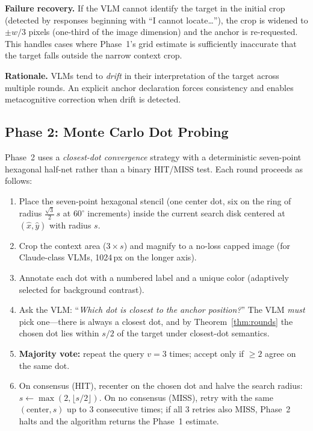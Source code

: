 \documentclass[sigconf,nonacm]{acmart}
\begin{document}
\textbf{Failure recovery.}  If the VLM cannot identify the target in
the initial crop (detected by responses beginning with ``I cannot
locate\ldots''), the crop is widened to $\pm w/3$ pixels (one-third
of the image dimension) and the anchor is re-requested.  This handles
cases where Phase~1's grid estimate is sufficiently inaccurate that the
target falls outside the narrow context crop.

\textbf{Rationale.} VLMs tend to \emph{drift} in their interpretation
of the target across multiple rounds.  An explicit anchor declaration
forces consistency and enables metacognitive correction when drift is
detected.


\subsection{Phase 2: Monte Carlo Dot Probing}
\label{sec:phase2}

Phase~2 uses a \emph{closest-dot convergence} strategy with a
deterministic seven-point hexagonal half-net rather than a binary
HIT/MISS test.  Each round proceeds as follows:

\begin{enumerate}
  \item Place the seven-point hexagonal stencil (one center dot,
    six on the ring of radius $\frac{\sqrt{3}}{2}\,s$ at $60^\circ$
    increments) inside the current search disk centered at
    $(\hat{x}, \hat{y})$ with radius $s$.
  \item Crop the context area ($3 \times s$) and magnify to a
    no-loss capped image (for Claude-class VLMs, 1024\,px on the
    longer axis).
  \item Annotate each dot with a numbered label and a unique color
    (adaptively selected for background contrast).
  \item Ask the VLM: ``\emph{Which dot is closest to the anchor
    position?}''  The VLM \emph{must} pick one---there is always a
    closest dot, and by Theorem~\ref{thm:rounds} the chosen dot lies
    within $s/2$ of the target under closest-dot semantics.
  \item \textbf{Majority vote:} repeat the query $v = 3$ times;
    accept only if $\geq 2$ agree on the same dot.
  \item On consensus (HIT), recenter on the chosen dot and halve the
    search radius: $s \gets \max(2, \lfloor s/2 \rfloor)$.  On no
    consensus (MISS), retry with the same $(\text{center}, s)$ up to
    $3$ consecutive times; if all $3$ retries also MISS, Phase~2
    halts and the algorithm returns the Phase~1 estimate.
\end{enumerate}
\end{document}
